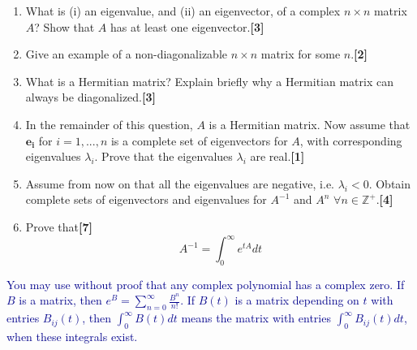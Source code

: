 \documentclass[a4paper]{article}
\begin{document}
\begin{qns}\leavevmode
\begin{enumerate}[label=(\alph*)]
    \item What is (i) an eigenvalue, and (ii) an eigenvector, of a complex $n\times n$ matrix $A$? Show that $A$ has at least one eigenvector.\hfill \textbf{[3]}
    \item Give an example of a non-diagonalizable $n\times n$ matrix for some $n$.\hfill \textbf{[2]}
    \item What is a Hermitian matrix? Explain briefly why a Hermitian matrix can always be diagonalized.\hfill \textbf{[3]}
    \item In the remainder of this question, $A$ is a Hermitian matrix. Now assume that $\mathbf{e_i}$ for $i=1,...,n$ is a complete set of eigenvectors for $A$, with corresponding eigenvalues $\lambda_i$. Prove that the eigenvalues $\lambda_i$ are real.\hfill \textbf{[1]}
    \item Assume from now on that all the eigenvalues are negative, i.e. $\lambda_i<0$. Obtain complete sets of eigenvectors and eigenvalues for $A^{-1}$ and $A^n$ $\forall n\in\mathbb{Z}^+$.\hfill \textbf{[4]}
    \item Prove that\hfill \textbf{[7]}
$$A^{-1}=\int_0^\infty e^{tA}dt$$
\end{enumerate}
\begin{mdframed}
\textcolor{darkblue}{You may use without proof that any complex polynomial has a complex zero. If $B$ is a matrix, then $e^B=\sum_{n=0}^\infty\frac{B^n}{n!}$. If $B(t)$ is a matrix depending on $t$ with entries $B_{ij}(t)$, then $\int_0^\infty B(t)dt$ means the matrix with entries $\int_0^\infty B_{ij}(t)dt$, when these integrals exist.}
\end{mdframed}
\end{qns}
\end{document}
